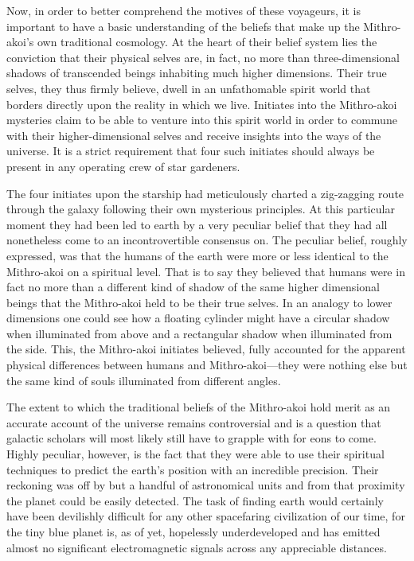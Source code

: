 \documentclass[12pt]{article}
\begin{document}
Now,
in order to better comprehend the motives of these voyageurs,
it is important to have a basic understanding of the beliefs that make up the Mithro-akoi's own traditional cosmology.
At the heart of their belief system lies the conviction that their physical selves are, in fact, no more than three-dimensional shadows of transcended beings inhabiting much higher dimensions.
Their true selves, they thus firmly believe, dwell in an unfathomable spirit world that borders directly upon the reality in which we live.
Initiates into the Mithro-akoi mysteries claim to be able to venture into this spirit world in order to commune with their higher-dimensional selves and receive insights into the ways of the universe.
It is a strict requirement that four such initiates should always be present in any operating crew of star gardeners.

The four initiates upon the starship had meticulously charted a zig-zagging route through the galaxy following their own mysterious principles.
At this particular moment they had been led to earth by a very peculiar belief that they had all nonetheless come to an incontrovertible consensus on.
The peculiar belief, roughly expressed, was that the humans of the earth were more or less identical to the Mithro-akoi on a spiritual level.
That is to say they believed that humans were in fact no more than a different kind of shadow of the same higher dimensional beings that the Mithro-akoi held to be their true selves.
In an analogy to lower dimensions one could see how a floating cylinder might have a circular shadow when illuminated from above and a rectangular shadow when illuminated from the side.
This, the Mithro-akoi initiates believed, fully accounted for the apparent physical differences between humans and Mithro-akoi---they were nothing else but the same kind of souls illuminated from different angles.

The extent to which the traditional beliefs of the Mithro-akoi hold merit as an accurate account of the universe remains controversial and is a question that galactic scholars will most likely still have to grapple with for eons to come.
Highly peculiar, however, is the fact that they were able to use their spiritual techniques to predict the earth's position with an incredible precision.
Their reckoning was off by but a handful of astronomical units and from that proximity the planet could be easily detected.
The task of finding earth would certainly have been devilishly difficult for any other spacefaring civilization of our time, for the tiny blue planet is, as of yet, hopelessly underdeveloped and has emitted almost no significant electromagnetic signals across any appreciable distances.
\end{document}
